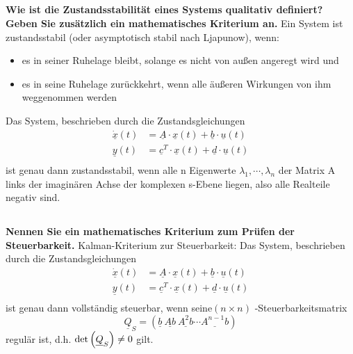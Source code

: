 \subsection{}
\textbf{Wie ist die Zustandsstabilität eines Systems qualitativ definiert? Geben Sie zusätzlich ein mathematisches Kriterium an.}
Ein System ist zustandsstabil (oder asymptotisch stabil nach Ljapunow), wenn:
\begin{itemize}
    \item es in seiner Ruhelage bleibt, solange es nicht von außen angeregt wird und
    \item es in seine Ruhelage zurückkehrt, wenn alle äußeren Wirkungen von ihm weggenommen werden
\end{itemize}
Das System, beschrieben durch die Zustandsgleichungen
\begin{equation}
    \begin{aligned}
        \dot{\underline{x}}(t) & =\underline{A}\cdot\underline{x}(t)+\underline{b}\cdot\underline{u}(t)   \\
        \underline{y}(t)       & =\underline{c}^T\cdot\underline{x}(t)+\underline{d}\cdot\underline{u}(t) \\
    \end{aligned}
\end{equation}
ist genau dann zustandsstabil, wenn alle n Eigenwerte $\lambda_1,\cdots,\lambda_n$ der Matrix A links der imaginären Achse
der komplexen s-Ebene liegen, also alle Realteile negativ sind.

\subsection{}
\textbf{Nennen Sie ein mathematisches Kriterium zum Prüfen der Steuerbarkeit.}
Kalman-Kriterium zur Steuerbarkeit:
Das System, beschrieben durch die Zustandsgleichungen
\begin{equation}
    \begin{aligned}
        \dot{\underline{x}}(t) & =\underline{A}\cdot\underline{x}(t)+\underline{b}\cdot\underline{u}(t)   \\
        \underline{y}(t)       & =\underline{c}^T\cdot\underline{x}(t)+\underline{d}\cdot\underline{u}(t) \\
    \end{aligned}
\end{equation}
ist genau dann vollständig steuerbar, wenn seine$(n\times n)$ -Steuerbarkeitsmatrix
\begin{equation}
    \underline{Q}_S=\left(\underline{b}\ \underline{Ab}\ \underline{A^2b}\cdots\underline{A^{n-1}b}\right)
\end{equation}
regulär ist, d.h. $\mathop{}\!\mathrm{det}\left(\underline{Q}_S\right)\neq 0$ gilt.